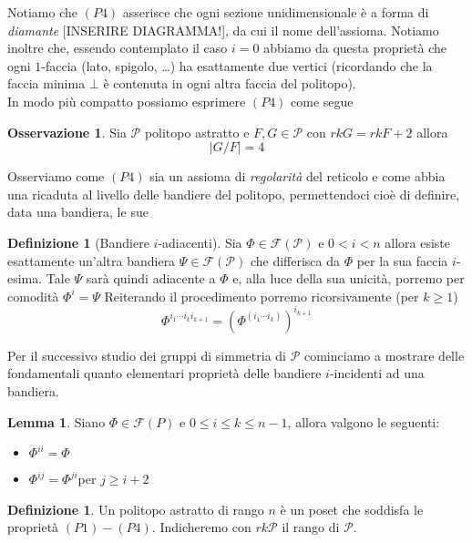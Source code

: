 \documentclass[a4paper,12pt]{report}
\newcommand{\p}{\mathcal{P}}
\theoremstyle{plain}
\theoremstyle{definition}
\newtheorem{defin}[teo]{Definizione}
\newtheorem{lem}[teo]{Lemma}
\newtheorem{oss}[teo]{Osservazione}
\begin{document}
Notiamo che $(P4)$ asserisce che ogni sezione unidimensionale \`e a forma di \emph{diamante} [INSERIRE DIAGRAMMA!], da cui il nome dell'assioma. Notiamo
inoltre che, essendo contemplato il caso $i=0$ abbiamo da questa propriet\`a che ogni $1$-faccia (lato, spigolo, \dots) ha esattamente due vertici 
(ricordando che la faccia minima $\bot$ \`e contenuta in ogni altra faccia del politopo).\\
In modo pi\`u compatto possiamo esprimere $(P4)$ come segue
\begin{oss}
Sia $\p$ politopo astratto e $F,G\in\p$ con $rkG = rkF + 2$ allora
\begin{equation*}
\left|G/F\right|=4
\end{equation*}
\end{oss}
Osserviamo come $(P4)$ sia un assioma di \emph{regolarit\`a} del reticolo e come abbia una ricaduta al livello delle bandiere del politopo,
permettendoci cio\`e di definire, data una bandiera, le sue

\begin{defin}[Bandiere $i$-adiacenti]
Sia $\Phi\in\mathcal{F}(\p)$ e $0<i<n$ allora esiste esattamente un'altra bandiera $\Psi\in\mathcal{F}(\p)$ che differisca da $\Phi$ per la sua faccia $i$-esima.
Tale $\Psi$ sar\`a quindi adiacente a $\Phi$ e, alla luce della sua unicit\`a, porremo per comodit\`a $\Phi^i=\Psi$
Reiterando il procedimento porremo ricorsivamente (per $k\geq 1$)
\begin{equation*}
\Phi^{i_1\cdots i_k i_{k+1}}=(\Phi^{(i_1\cdots i_k)})^{i_{k+1}}
\end{equation*}
\end{defin}
Per il successivo studio dei gruppi di simmetria di $\p$ cominciamo a mostrare delle fondamentali quanto elementari propriet\`a delle bandiere $i$-incidenti
ad una bandiera.

\begin{lem}
Siano $\Phi\in\mathcal{F}(P)$ e $0\leq i\leq k\leq n-1$, allora valgono le seguenti:
\begin{itemize}
\item $\Phi^{ii} = \Phi$
\item $\Phi^{ij} = \Phi^{ji}$\quad per $j\geq i+2$
\end{itemize}
\end{lem}

\begin{defin}
Un politopo astratto di rango $n$ \`e un poset che soddisfa le propriet\`a $(P1)-(P4)$. Indicheremo con $rk\p$ il rango di $\p$.
\end{defin}
\end{document}
